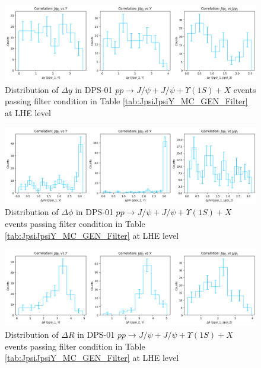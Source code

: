 \documentclass[10pt,twocolumn]{article}
\begin{document}
\begin{figure}[!htbp]
    \centering
    \includegraphics[width=1.0\linewidth]{images/LHE_LEVEL_DPS_J_JY1S_DeltaY_filtered.png}
    \caption{Distribution of $\Delta y$ in DPS-01 $pp\to J/\psi+J/\psi+\Upsilon(1S)+X$ events passing filter condition in Table \ref{tab:JpsiJpsiY_MC_GEN_Filter} at LHE level}
    \label{fig:DPS01_JJY1S_filtered_DeltaY_LHE}
\end{figure}

\begin{figure}[!htbp]
    \centering
    \includegraphics[width=1.0\linewidth]{images/LHE_LEVEL_DPS_J_JY1S_DeltaPhi_filtered.png}
    \caption{Distribution of $\Delta \phi$ in DPS-01 $pp\to J/\psi+J/\psi+\Upsilon(1S)+X$ events passing filter condition in Table \ref{tab:JpsiJpsiY_MC_GEN_Filter} at LHE level}
    \label{fig:DPS01_JJY1S_filtered_DeltaPhi_LHE}
\end{figure}

\begin{figure}[!htbp]
    \centering
    \includegraphics[width=1.0\linewidth]{images/LHE_LEVEL_DPS_J_JY1S_DeltaR_filtered.png}
    \caption{Distribution of $\Delta R$ in DPS-01 $pp\to J/\psi+J/\psi+\Upsilon(1S)+X$ events passing filter condition in Table \ref{tab:JpsiJpsiY_MC_GEN_Filter} at LHE level}
    \label{fig:DPS01_JJY1S_filtered_DeltaR_LHE}
\end{figure}
\end{document}
